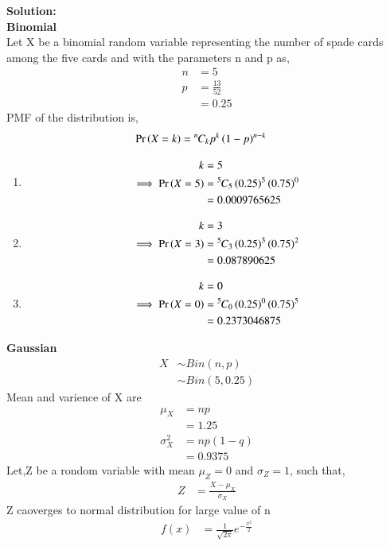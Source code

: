\documentclass[journal,11pt,onecolumn]{IEEEtran}
\providecommand{\pr}[1]{\ensuremath{\Pr\left(#1\right)}}
\providecommand{\brak}[1]{\ensuremath{\left(#1\right)}}
\newcommand{\solution}{\noindent \textbf{Solution: }}
\providecommand{\pr}[1]{\ensuremath{\Pr\left(#1\right)}}
\newcommand*{\permcomb}[4][0mu]{{{}^{#3}\mkern#1#2_{#4}}}
\newcommand*{\comb}[1][-1mu]{\permcomb[#1]{C}}
\begin{document}
\solution\\
\textbf{Binomial}\\
Let X be a binomial random variable representing the number of spade cards among the five cards and with the parameters n and p as,
\begin{align}
	n&=5\\
	p&=\frac{13}{52}\\
	&=0.25
\end{align}
PMF of the distribution is,
\begin{align}
	\pr{X=k}&=\comb{n}{k}p^k\brak{1-p}^{n-k}
\end{align}
\begin{enumerate}
	\item
	\begin{align}
	k&=5\\
	\implies \pr{X=5}&=\comb{5}{5}\brak{0.25}^5\brak{0.75}^0\\
	&=0.0009765625
\end{align}
	\item
	\begin{align}
	k&=3\\
	\implies\pr{X=3}&=\comb{5}{3}\brak{0.25}^3\brak{0.75}^2\\
	&=0.087890625
\end{align}
	\item
	\begin{align}
	k&=0\\
	\implies\pr{X=0}&=\comb{5}{0}\brak{0.25}^0\brak{0.75}^5\\
	&=0.2373046875
\end{align}
\end{enumerate}
\textbf{Gaussian}\\
\begin{align}
	X &\sim Bin\brak{n,p}\\
	&\sim Bin\brak{5,0.25}
\end{align}
Mean and varience of X are
\begin{align}
	\mu_X&=np\\
	&=1.25\\
	\sigma^2_X&=np\brak{1-q}\\
	&=0.9375
\end{align}
Let,Z be a rondom variable with mean $\mu_Z = 0$ and $\sigma_Z=1$, such that,
\begin{align}
	Z&=\frac{X- \mu_X}{\sigma_X}
\end{align}
Z caoverges to normal distribution for large value of n
\begin{align}
	f\brak{x}&=\frac{1}{\sqrt{2\pi}}e^{-\frac{x^2}{2}}
\end{align}
\end{document}
